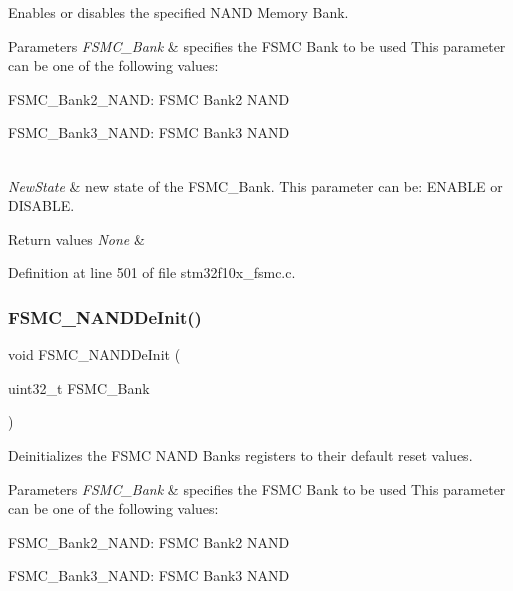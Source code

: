 Enables or disables the specified N\+A\+ND Memory Bank. 


\begin{DoxyParams}{Parameters}
{\em F\+S\+M\+C\+\_\+\+Bank} & specifies the F\+S\+MC Bank to be used This parameter can be one of the following values\+: \begin{DoxyItemize}
\item F\+S\+M\+C\+\_\+\+Bank2\+\_\+\+N\+A\+ND\+: F\+S\+MC Bank2 N\+A\+ND \item F\+S\+M\+C\+\_\+\+Bank3\+\_\+\+N\+A\+ND\+: F\+S\+MC Bank3 N\+A\+ND \end{DoxyItemize}
\\
\hline
{\em New\+State} & new state of the F\+S\+M\+C\+\_\+\+Bank. This parameter can be\+: E\+N\+A\+B\+LE or D\+I\+S\+A\+B\+LE. \\
\hline
\end{DoxyParams}

\begin{DoxyRetVals}{Return values}
{\em None} & \\
\hline
\end{DoxyRetVals}


Definition at line 501 of file stm32f10x\+\_\+fsmc.\+c.

\mbox{\label{group___f_s_m_c___exported___functions_gafb749503293474a68555961bd8f120e1}} 
\subsubsection{\texorpdfstring{F\+S\+M\+C\+\_\+\+N\+A\+N\+D\+De\+Init()}{FSMC\_NANDDeInit()}}
{\footnotesize\ttfamily void F\+S\+M\+C\+\_\+\+N\+A\+N\+D\+De\+Init (\begin{DoxyParamCaption}\item[{uint32\+\_\+t}]{F\+S\+M\+C\+\_\+\+Bank }\end{DoxyParamCaption})}



Deinitializes the F\+S\+MC N\+A\+ND Banks registers to their default reset values. 


\begin{DoxyParams}{Parameters}
{\em F\+S\+M\+C\+\_\+\+Bank} & specifies the F\+S\+MC Bank to be used This parameter can be one of the following values\+: \begin{DoxyItemize}
\item F\+S\+M\+C\+\_\+\+Bank2\+\_\+\+N\+A\+ND\+: F\+S\+MC Bank2 N\+A\+ND \item F\+S\+M\+C\+\_\+\+Bank3\+\_\+\+N\+A\+ND\+: F\+S\+MC Bank3 N\+A\+ND \end{DoxyItemize}
\\
\hline
\end{DoxyParams}

